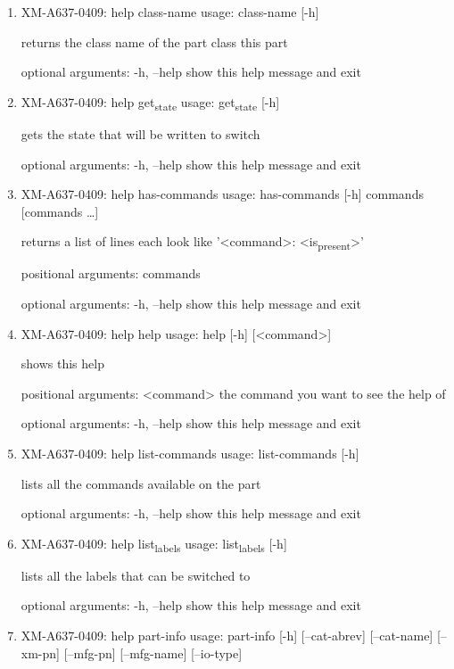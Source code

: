\documentclass[11pt]{article}
\begin{document}
\begin{enumerate}
\item XM-A637-0409: help class-name
\label{sec:org57ca474}
usage: class-name [-h]

returns the class name of the part class this part

optional arguments:
  -h, --help  show this help message and exit

\item XM-A637-0409: help get\textsubscript{state}
\label{sec:orga9158aa}
usage: get\textsubscript{state} [-h]

gets the state that will be written to switch

optional arguments:
  -h, --help  show this help message and exit

\item XM-A637-0409: help has-commands
\label{sec:org573bb88}
usage: has-commands [-h] commands [commands \ldots{}]

returns a list of lines each look like '<command>: <is\textsubscript{present}>'

positional arguments:
  commands

optional arguments:
  -h, --help  show this help message and exit

\item XM-A637-0409: help help
\label{sec:org6b88015}
usage: help [-h] [<command>]

shows this help

positional arguments:
  <command>   the command you want to see the help of

optional arguments:
  -h, --help  show this help message and exit

\item XM-A637-0409: help list-commands
\label{sec:orgcc946f4}
usage: list-commands [-h]

lists all the commands available on the part

optional arguments:
  -h, --help  show this help message and exit

\item XM-A637-0409: help list\textsubscript{labels}
\label{sec:org2bbeb9e}
usage: list\textsubscript{labels} [-h]

lists all the labels that can be switched to

optional arguments:
  -h, --help  show this help message and exit

\item XM-A637-0409: help part-info
\label{sec:org46690a9}
usage: part-info  [-h] [--cat-abrev] [--cat-name] [--xm-pn] [--mfg-pn] [--mfg-name]
        [--io-type]


\end{enumerate}
\end{document}
